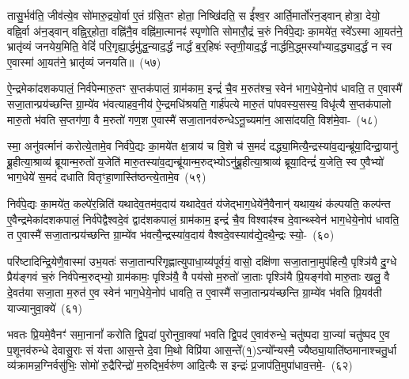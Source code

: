 तासु॒र्भव॑ति॒ जीव॑त्ये॒व सो॑मारु॒द्रयो॒र्वा ए॒तं ग्र॑सि॒तꣳ होता॒ निष्खि॑दति॒ स ई᳚श्व॒र आर्ति॒मार्तो॑रन॒ड्वान् होत्रा॒ देयो॒ वह्नि॒र्वा अ॑न॒ड्वान् वह्नि॒र्॒\mbox{}होता॒ वह्नि॑नै॒व वह्नि॑मा॒त्मानꣴ॑ स्पृणोति सोमारौ॒द्रं च॒रुं निर्व॑पे॒द्यः का॒मये॑त॒ स्वे᳚\-ऽस्मा आ॒यत॑ने॒ भ्रातृ॑व्यं जनयेय॒मिति॒ वेदिं॑ परि॒गृह्या॒र्द्धमु॑द्ध॒न्याद॒र्द्धं नार्द्धं ब॒र्॒\mbox{}हिषः॑ स्तृणी॒याद॒र्द्धं नार्द्धमि॒द्ध्मस्या᳚भ्याद॒द्ध्याद॒र्द्धं न स्व ए॒वास्मा॑ आ॒यत॑ने॒ भ्रातृ॑व्यं जनयति॥~(५७)\ip

{\anuvakamend[{रु॒द्रो भे॑ष॒जं वि॒न्दते॒ यदि॑ स्तृणी॒याद॒र्द्धं द्वाद॑श च}]}

ऐ॒न्द्रमेका॑\-दश\-कपालं॒ निर्व॑पेन्मारु॒तꣳ स॒प्तक॑पालं॒ ग्राम॑काम॒ इन्द्रं॑ चै॒व म॒रुत॑श्च॒ स्वेन॑ भाग॒\-धेये॒नोप॑ धावति॒ त ए॒वास्मै॑ सजा॒तान्प्रय॑च्छन्ति ग्रा॒म्ये॑व भ॑वत्याहव॒नीय॑ ऐ॒न्द्रमधि॑श्रयति॒ गार्\mbox{}ह॑पत्ये मारु॒तं पा॑पवस्य॒सस्य॒ विधृ॑त्यै स॒प्तक॑पालो मारु॒तो भ॑वति स॒प्तग॑णा॒ वै म॒रुतो॑ गण॒श ए॒वास्मै॑ सजा॒तानव॑\-रुन्धे\-ऽनू॒च्यमा॑न॒ आसा॑दयति॒ विश॑मे॒वा-~(५८)\ip

स्मा॒ अनु॑वर्त्मानं करोत्ये॒तामे॒व निर्व॑पे॒द्यः का॒मये॑त क्ष॒त्राय॑ च वि॒शे च॑ स॒मदं॑ दद्ध्या॒मित्यै॒न्द्रस्या॑व॒द्यन्ब्रू॑या॒दिन्द्रा॒यानु॑ ब्रू॒हीत्या॒श्राव्य॑ ब्रूयान्म॒रुतो॑ य॒जेति॑ मारु॒तस्या॑व॒द्यन्ब्रू॑यान्म॒रुद्भ्यो\-ऽनु॑ब्रू॒हीत्या॒श्राव्य॑ ब्रूया॒दिन्द्रं॑ य॒जेति॒ स्व ए॒वैभ्यो॑ भाग॒\-धेये॑ स॒मदं॑ दधाति वितृꣳहा॒णास्ति॑ष्ठन्त्ये॒तामे॒व~(५९)\ip

निर्व॑पे॒द्यः का॒मये॑त॒ कल्पे॑र॒न्निति॑ यथादेव॒तम॑व॒दाय॑ यथादेव॒तं य॑जेद्भाग॒\-धेये॑नै॒वैनान्॑ यथाय॒थं क॑ल्पयति॒ कल्प॑न्त ए॒वैन्द्रमेका॑\-दश\-कपालं॒ निर्व॑पेद्वैश्वदे॒वं द्वाद॑श\-कपालं॒ ग्राम॑काम॒ इन्द्रं॑ चै॒व विश्वाꣴ॑श्च दे॒वान्थ्स्वेन॑ भाग॒\-धेये॒नोप॑ धावति॒ त ए॒वास्मै॑ सजा॒तान्प्रय॑च्छन्ति ग्रा॒म्ये॑व भ॑वत्यै॒न्द्रस्या॑व॒दाय॑ वैश्वदे॒वस्याव॑द्ये॒दथै॒न्द्रः स्यो॒-~(६०)\ip

परि॑ष्टादिन्द्रि॒येणै॒वास्मा॑ उभ॒यतः॑ सजा॒तान्परि॑\-गृह्णात्युपाधा॒य्य॑\-पूर्वयं॒ वासो॒ दक्षि॑णा सजा॒ताना॒मुप॑हित्यै॒ पृश्ञि॑यै दु॒ग्धे प्रैय॑ङ्गवं च॒रुं निर्व॑पेन्म॒रुद्भ्यो॒ ग्राम॑कामः॒ पृश्ञि॑यै॒ वै पय॑सो म॒रुतो॑ जा॒ताः पृश्ञि॑यै प्रि॒यङ्ग॑वो मारु॒ताः खलु॒ वै दे॒वत॑या सजा॒ता म॒रुत॑ ए॒व स्वेन॑ भाग॒\-धेये॒नोप॑ धावति॒ त ए॒वास्मै॑ सजा॒तान्प्रय॑च्छन्ति ग्रा॒म्ये॑व भ॑वति प्रि॒यव॑ती याज्यानुवा॒क्ये॑~(६१)\ip

भवतः प्रि॒यमे॒वैनꣳ॑ समा॒नानां᳚ करोति द्वि॒पदा॑ पुरोनुवा॒क्या॑ भवति द्वि॒पद॑ ए॒वाव॑\-रुन्धे॒ चतु॑ष्पदा या॒ज्या॑ चतु॑ष्पद ए॒व प॒शूनव॑\-रुन्धे देवासु॒राः सं य॑त्ता आस॒न्ते दे॒वा मि॒थो विप्रि॑या आस॒न्ते᳚(१॒)\-ऽन्यो᳚न्यस्मै॒ ज्यैष्ठ्या॒याति॑ष्ठमानाश्चतु॒र्धा व्य॑क्रामन्न॒ग्निर्वसु॑भिः॒ सोमो॑ रु॒द्रैरिन्द्रो॑ म॒रुद्भि॒र्वरु॑ण आदि॒त्यैः स इन्द्रः॑ प्र॒जा\-प॑ति॒मुपा॑धाव॒त्तमे॒-~(६२)\ip

